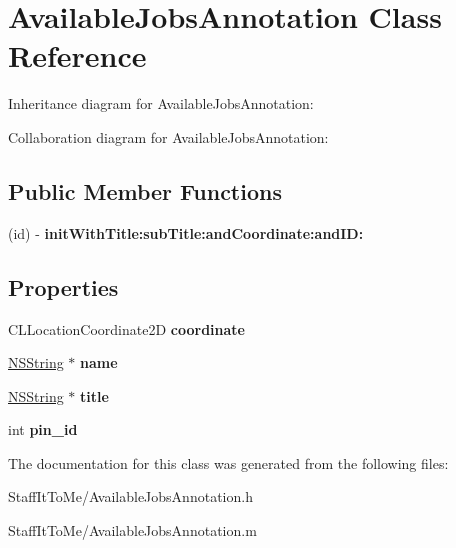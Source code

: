 \hypertarget{interface_available_jobs_annotation}{
\section{\-Available\-Jobs\-Annotation \-Class \-Reference}
\label{interface_available_jobs_annotation}
}


\-Inheritance diagram for \-Available\-Jobs\-Annotation\-:


\-Collaboration diagram for \-Available\-Jobs\-Annotation\-:
\subsection*{\-Public \-Member \-Functions}
\begin{DoxyCompactItemize}
\item 
\hypertarget{interface_available_jobs_annotation_a2b1794bb6d06f49fe3cbb93dab514b19}{
(id) -\/ {\bfseries init\-With\-Title\-:sub\-Title\-:and\-Coordinate\-:and\-I\-D\-:}}
\label{interface_available_jobs_annotation_a2b1794bb6d06f49fe3cbb93dab514b19}

\end{DoxyCompactItemize}
\subsection*{\-Properties}
\begin{DoxyCompactItemize}
\item 
\hypertarget{interface_available_jobs_annotation_a1c9b910460ab432046c7f6add0566420}{
\-C\-L\-Location\-Coordinate2\-D {\bfseries coordinate}}
\label{interface_available_jobs_annotation_a1c9b910460ab432046c7f6add0566420}

\item 
\hypertarget{interface_available_jobs_annotation_a58811a689bc01f31a3f004a7469b45fb}{
\hyperlink{class_n_s_string}{\-N\-S\-String} $\ast$ {\bfseries name}}
\label{interface_available_jobs_annotation_a58811a689bc01f31a3f004a7469b45fb}

\item 
\hypertarget{interface_available_jobs_annotation_a1d1e10d3b3df1f7cf4af1d1ac4f1c5da}{
\hyperlink{class_n_s_string}{\-N\-S\-String} $\ast$ {\bfseries title}}
\label{interface_available_jobs_annotation_a1d1e10d3b3df1f7cf4af1d1ac4f1c5da}

\item 
\hypertarget{interface_available_jobs_annotation_a843e4387818ece4aa87e0d37a31506db}{
int {\bfseries pin\-\_\-id}}
\label{interface_available_jobs_annotation_a843e4387818ece4aa87e0d37a31506db}

\end{DoxyCompactItemize}


\-The documentation for this class was generated from the following files\-:\begin{DoxyCompactItemize}
\item 
\-Staff\-It\-To\-Me/\-Available\-Jobs\-Annotation.\-h\item 
\-Staff\-It\-To\-Me/\-Available\-Jobs\-Annotation.\-m\end{DoxyCompactItemize}
